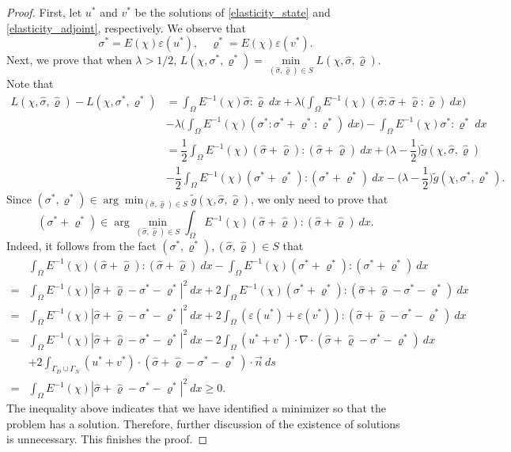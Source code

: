 \documentclass{amsart}
\begin{document}
\begin{proof}
    First, let $u^*$ and $v^*$ be the solutions of \eqref{elasticity_state} and \eqref{elasticity_adjoint}, respectively. We observe that
    \begin{equation}
    \sigma^*=E(\chi)\varepsilon(u^*),\quad \varrho^*=E(\chi)\varepsilon(v^*).
    \end{equation}
    Next, we prove that when $ \lambda > 1/2 $, $L(\chi,\sigma^*,\varrho^*)= \min\limits_{(\hat\sigma,\hat\varrho)\in S}L(\chi,\hat\sigma,\hat\varrho)$.  
    Note that
    \begin{align*}
        L(\chi,\hat\sigma,\hat\varrho)-L(\chi,\sigma^*,\varrho^*)
        &=\int_{\Omega}E^{-1}(\chi)\hat\sigma:\hat\varrho\ dx +\lambda\Big(\int_{\Omega}E^{-1}(\chi)(\hat\sigma:\hat\sigma+\hat\varrho:\hat\varrho)\ dx\Big)\\
        &-\lambda\Big(\int_{\Omega}E^{-1}(\chi)(\sigma^*:\sigma^*+\varrho^*:\varrho^*)\ dx\Big)-\int_{\Omega}E^{-1}(\chi)\sigma^*:\varrho^*\ dx\\
        &=\dfrac{1}{2}\int_{\Omega}E^{-1}(\chi)(\hat\sigma+\hat\varrho):(\hat\sigma+\hat\varrho)\ dx+\Big(\lambda-\dfrac{1}{2}\Big)\tilde{g}(\chi,\hat\sigma,\hat\varrho)\\
        &-\dfrac{1}{2}\int_{\Omega}E^{-1}(\chi)(\sigma^*+\varrho^*):(\sigma^*+\varrho^*)\ dx-\Big(\lambda-\dfrac{1}{2}\Big)\tilde{g}(\chi,\sigma^*,\varrho^*).
    \end{align*}
    Since $(\sigma^*,\varrho^*)\in \arg\min_{(\hat{\sigma},\hat{\varrho})\in S} \tilde{g}(\chi,\hat{\sigma},\hat{\varrho})$, we only need to prove that
    $$(\sigma^*+\varrho^*)\in\arg\min_{(\hat\sigma,\hat\varrho)\in S}\int_{\Omega}E^{-1}(\chi)(\hat\sigma+\hat\varrho):(\hat\sigma+\hat\varrho)\ dx.$$
Indeed, it follows from the fact $(\sigma^*,\varrho^*),(\hat\sigma,\hat\varrho)\in S$ that 
    \begin{align*}
        &\int_{\Omega}E^{-1}(\chi)(\hat\sigma+\hat\varrho):(\hat\sigma+\hat\varrho)\ dx-\int_{\Omega}E^{-1}(\chi)(\sigma^*+\varrho^*):(\sigma^*+\varrho^*)\ dx\\
        =&\int_{\Omega}E^{-1}(\chi)|\hat\sigma+\hat\varrho-\sigma^*-\varrho^*|^2\ dx + 2\int_{\Omega}E^{-1}(\chi)(\sigma^*+\varrho^*):(\hat\sigma+\hat\varrho-\sigma^*-\varrho^*)\ dx\\
        =&\int_{\Omega}E^{-1}(\chi)|\hat\sigma+\hat\varrho-\sigma^*-\varrho^*|^2\ dx + 2\int_{\Omega}(\varepsilon(u^*)+\varepsilon(v^*)):(\hat\sigma+\hat\varrho-\sigma^*-\varrho^*)\ dx\\
        =&\int_{\Omega}E^{-1}(\chi)|\hat\sigma+\hat\varrho-\sigma^*-\varrho^*|^2\ dx - 2\int_{\Omega}(u^*+v^*)\cdot\nabla\cdot(\hat\sigma+\hat\varrho-\sigma^*-\varrho^*)\ dx\\
        &+2\int_{\Gamma_D\cup\Gamma_N}(u^*+v^*)\cdot(\hat\sigma+\hat\varrho-\sigma^*-\varrho^*)\cdot\vec{n}\ ds\\
        =&\int_{\Omega}E^{-1}(\chi)|\hat\sigma+\hat\varrho-\sigma^*-\varrho^*|^2\ dx\geq 0.
    \end{align*}
    The inequality above indicates that we have identified a minimizer so that the problem has a solution. Therefore, further discussion of the existence of solutions is unnecessary. This finishes the proof.
\end{proof}
\end{document}
